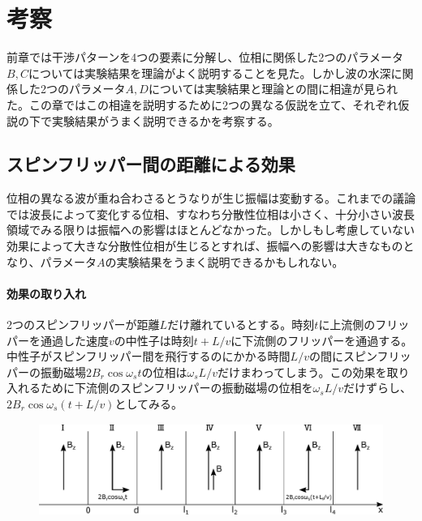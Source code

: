 \section{考察}
前章では干渉パターンを4つの要素に分解し、位相に関係した2つのパラメータ$B,C$については実験結果を理論がよく説明することを見た。しかし波の水深に関係した2つのパラメータ$A,D$については実験結果と理論との間に相違が見られた。この章ではこの相違を説明するために2つの異なる仮説を立て、それぞれ仮説の下で実験結果がうまく説明できるかを考察する。

\subsection{スピンフリッパー間の距離による効果}
位相の異なる波が重ね合わさるとうなりが生じ振幅は変動する。これまでの議論では波長によって変化する位相、すなわち分散性位相は小さく、十分小さい波長領域でみる限りは振幅への影響はほとんどなかった。しかしもし考慮していない効果によって大きな分散性位相が生じるとすれば、振幅への影響は大きなものとなり、パラメータ$A$の実験結果をうまく説明できるかもしれない。

\paragraph{効果の取り入れ}
2つのスピンフリッパーが距離$L$だけ離れているとする。時刻$t$に上流側のフリッパーを通過した速度$v$の中性子は時刻$t+L/v$に下流側のフリッパーを通過する。中性子がスピンフリッパー間を飛行するのにかかる時間$L/v$の間にスピンフリッパーの振動磁場$2B_r\cos\omega_s t$の位相は$\omega_s L/v$だけまわってしまう。この効果を取り入れるために下流側のスピンフリッパーの振動磁場の位相を$\omega_s L/v$だけずらし、$2B_r\cos\omega_s (t+L/v)$としてみる。
\begin{figure}[h]
\centering
\includegraphics[height=3cm]{discussion/FD/FD_setting.pdf}
\end{figure}

